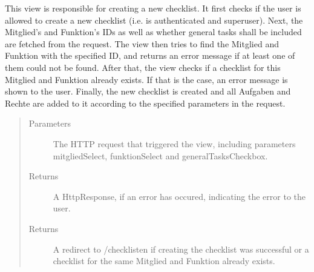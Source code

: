 \documentclass[letterpaper,10pt,english]{sphinxmanual}
\begin{document}

\begin{fulllineitems}
\label{\detokenize{masterCodeDoc:checklisten.views.erstellen}}
This view is responsible for creating a new checklist.
It first checks if the user is allowed to create a new checklist (i.e. is authenticated and superuser).
Next, the Mitglied’s and Funktion’s IDs as well as whether general tasks shall be included are fetched from the request.
The view then tries to find the Mitglied and Funktion with the specified ID, and returns an error message if at least one of them could not be found.
After that, the view checks if a checklist for this Mitglied and Funktion already exists. If that is the case, an error message is shown to the user.
Finally, the new checklist is created and all Aufgaben and Rechte are added to it according to the specified parameters in the request.
\begin{quote}\begin{description}
\item[{Parameters}] \leavevmode
{} \textendash{} The HTTP request that triggered the view, including parameters mitgliedSelect, funktionSelect and generalTasksCheckbox.

\item[{Returns}] \leavevmode
A HttpResponse, if an error has occured, indicating the error to the user.

\item[{Returns}] \leavevmode
A redirect to /checklisten if creating the checklist was successful or a checklist for the same Mitglied and Funktion already exists.

\end{description}\end{quote}

\end{fulllineitems}

\end{document}

